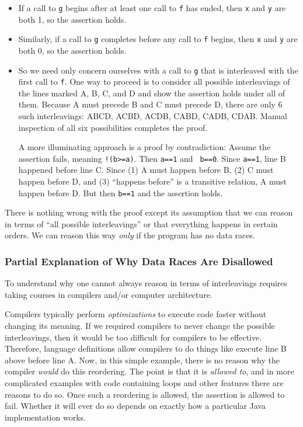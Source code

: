 \documentclass[10pt]{article}
\begin{document}
\begin{itemize}
\item If a call to {\tt g} begins after at least one call to {\tt f}
  has ended, then {\tt x} and {\tt y} are both 1, so the assertion
  holds.
\item Similarly, if a call to {\tt g} completes before any call to
  {\tt f} begins, then {\tt x} and {\tt y} are both 0, so the
  assertion holds.
\item So we need only concern ourselves with a call to {\tt g} that is
  interleaved with the first call to {\tt f}.  One way to proceed is
  to consider all possible interleavings of the lines marked A, B, C,
  and D and show the assertion holds under all of them.  Because A
  must precede B and C must precede D, there are only 6 such
  interleavings: ABCD, ACBD, ACDB, CABD, CADB, CDAB.  Manual
  inspection of all six possibilities completes the proof.  
  
  A more illuminating approach is a proof by contradiction: Assume the
  assertion fails, meaning {\tt !(b>=a)}.  Then {\tt a==1} and {\tt
    b==0}.  Since {\tt a==1}, line B happened before line C\@.  Since
  (1) A must happen before B, (2) C must happen before D, and (3) ``happens
  before'' is a transitive relation, A must happen before D\@.  But
  then {\tt b==1} and the assertion holds.
\end{itemize}

There is nothing wrong with the proof except its assumption that we can
reason in terms of ``all possible interleavings'' or that everything
happens in certain orders.  We can reason this way \emph{only} if the
program has no data races.

\subsubsection{Partial Explanation of Why Data Races Are Disallowed}
\label{sec:data-race-why}

To understand why one cannot always reason in terms of interleavings
requires taking courses in compilers and/or computer architecture.

Compilers typically perform \emph{optimizations} to execute code
faster without changing its meaning.  If we required compilers to
never change the possible interleavings, then it would be too
difficult for compilers to be effective.  Therefore, language
definitions allow compilers to do things like execute line B above
before line A.  Now, in this simple example, there is no reason why
the compiler \emph{would} do this reordering.  The point is that it is
\emph{allowed to}, and in more complicated examples with code
containing loops and other features there are reasons to do so.  Once
such a reordering is allowed, the assertion is allowed to fail.
Whether it will ever do so depends on exactly how a particular Java
implementation works.
\end{document}
